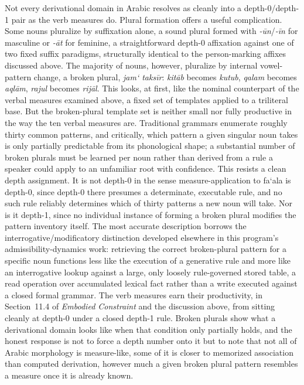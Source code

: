 \documentclass[11pt]{article}
\begin{document}
Not every derivational domain in Arabic resolves as cleanly into a
depth-0/depth-1 pair as the verb measures do. Plural formation offers a
useful complication. Some nouns pluralize by suffixation alone, a sound
plural formed with \emph{-ūn}/\emph{-īn} for masculine or \emph{-āt} for
feminine, a straightforward depth-0 affixation against one of two fixed
suffix paradigms, structurally identical to the person-marking affixes
discussed above. The majority of nouns, however, pluralize by internal
vowel-pattern change, a broken plural, \emph{jam` taks\=ir}: \emph{kit\=ab}
becomes \emph{kutub}, \emph{qalam} becomes \emph{aql\=am},
\emph{rajul} becomes \emph{rij\=al}. This looks, at first, like the nominal
counterpart of the verbal measures examined above, a fixed set of
templates applied to a triliteral base. But the broken-plural template set
is neither small nor fully productive in the way the ten verbal measures
are. Traditional grammars enumerate roughly thirty common patterns, and
critically, which pattern a given singular noun takes is only partially
predictable from its phonological shape; a substantial number of broken
plurals must be learned per noun rather than derived from a rule a speaker
could apply to an unfamiliar root with confidence. This resists a clean
depth assignment. It is not depth-0 in the sense measure-application to
fa`ala is depth-0, since depth-0 there presumes a determinate, executable
rule, and no such rule reliably determines which of thirty patterns a new
noun will take. Nor is it depth-1, since no individual instance of forming
a broken plural modifies the pattern inventory itself. The most accurate
description borrows the interrogative/modificatory distinction developed
elsewhere in this program's admissibility-dynamics work: retrieving the
correct broken-plural pattern for a specific noun functions less like the
execution of a generative rule and more like an interrogative lookup
against a large, only loosely rule-governed stored table, a read operation
over accumulated lexical fact rather than a write executed against a
closed formal grammar. The verb measures earn their productivity, in
Section~11.4 of \emph{Embodied Constraint} and the discussion above, from
sitting cleanly at depth-0 under a closed depth-1 rule. Broken plurals show
what a derivational domain looks like when that condition only partially
holds, and the honest response is not to force a depth number onto it but
to note that not all of Arabic morphology is measure-like, some of it is
closer to memorized association than computed derivation, however much a
given broken plural pattern resembles a measure once it is already known.
\end{document}

